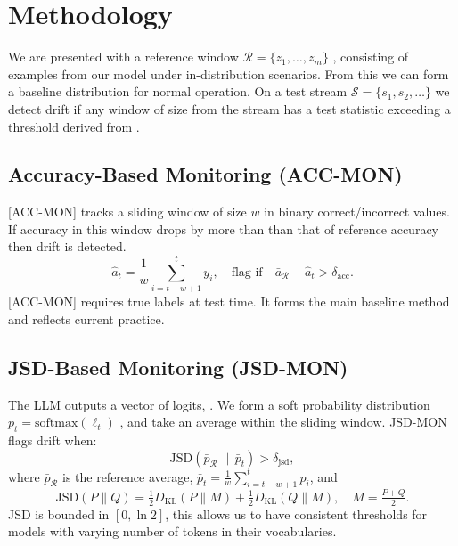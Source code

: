 \documentclass[12pt,a4paper]{article}
\begin{document}
\section{Methodology}
\label{sec:method}





We are presented with a reference window $\mathcal{R}=\{z_1,\ldots,z_m\}$ , consisting of examples from our model under in-distribution scenarios. From this we can form a baseline distribution for normal operation. On a test stream $\mathcal{S}=\{s_1,s_2,\ldots\}$ we detect drift if any window of size from the stream has a test statistic exceeding a threshold derived from .

\subsection{Accuracy-Based Monitoring (\textsc{ACC-MON})}
[ACC-MON] tracks a sliding window of size $w$ in binary correct/incorrect values. If accuracy in this window drops by more than than that of reference accuracy then drift is detected.
\begin{equation}
\hat{a}_t = \frac{1}{w}\sum_{i=t-w+1}^{t} y_i,\quad
\text{flag if}\quad \bar{a}_\mathcal{R} - \hat{a}_t > \delta_\mathrm{acc}.
\label{eq:acc}
\end{equation}
[ACC-MON] requires true labels at test time. It forms the main baseline method and reflects current practice.

\subsection{JSD-Based Monitoring (\textsc{JSD-MON})}
The LLM outputs a vector of logits, . We form a soft probability distribution $p_t=\mathrm{softmax}(\ell_t)$ , and take an average within the sliding window. \textsc{JSD-MON} flags drift when:
\begin{equation}
\mathrm{JSD}(\bar{p}_\mathcal{R}\,\|\,\bar{p}_t)>\delta_\mathrm{jsd},
\label{eq:jsd}
\end{equation}
where $\bar{p}_\mathcal{R}$ is the reference average,
$\bar{p}_t=\frac{1}{w}\sum_{i=t-w+1}^{t}p_i$, and
\begin{equation}
\mathrm{JSD}(P\|Q)=\tfrac{1}{2}D_\mathrm{KL}(P\|M)+\tfrac{1}{2}D_\mathrm{KL}(Q\|M),\quad
M=\tfrac{P+Q}{2}.
\end{equation}
JSD is bounded in $[0,\ln 2]$, this allows us to have consistent thresholds for models with varying number of tokens in their vocabularies.
\end{document}
